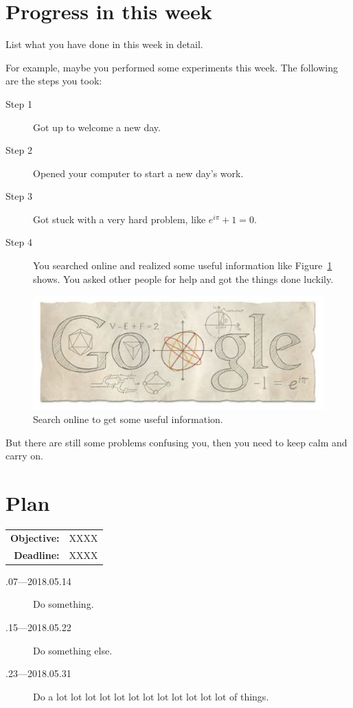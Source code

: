\documentclass[a4paper]{article}
\begin{document}
\section{Progress in this week}

List what you have done in this week in detail.

For example, maybe you performed some experiments this week. The following are the steps you took:

\begin{description}
\item [Step 1]
Got up to welcome a new day.
\item[Step 2]
Opened your computer to start a new day's work.
\item[Step 3]
Got stuck with a very hard problem, like $e^{i \pi} + 1 = 0$.
\item[Step 4]
You searched online and realized some useful information like Figure~\ref{fig:google} shows. You asked other people for help and got the things done luckily.
\end{description}

\begin{figure}[hb]
    \centering
    \includegraphics{figures/google}
    \caption{Search online to get some useful information.}
    \label{fig:google}
\end{figure}

But there are still some problems confusing you, then you need to keep calm and carry on.

\section{Plan}

\begin{tabular}{rl}
	\textbf{Objective:} & XXXX \\
    \textbf{Deadline:} & XXXX 
\end{tabular}

\begin{description}
    \item[.07---2018.05.14] Do something.
    \item[.15---2018.05.22] Do something else.
    \item[.23---2018.05.31] Do a lot lot lot lot lot lot lot lot lot lot lot lot of things.
\end{description}



\end{document}
